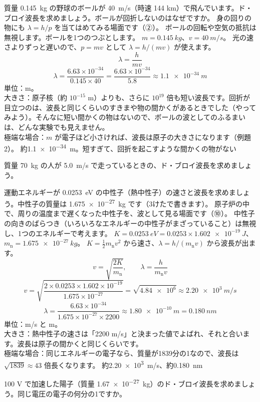 \label{ph:原-3:ex4}
\begin{phreidai}[野球のボールの波長]
質量 \qty{0.145}{kg} の野球のボールが \qty{40}{m/s}（時速 144 km）で飛んでいます。ド・ブロイ波長を求めましょう。ボールが回折しないのはなぜですか。
\phbamen
身の回りの物にも $\lambda=h/p$ を当てはめてみる場面です（②）。
\phmushi
ボールの回転や空気の抵抗は無視します。ボールを1つのつぶとします。
\phzu
$m=\qty{0.145}{kg}$、$v=\qty{40}{m/s}$。
\phriyu
光の速さよりずっと遅いので、$p=mv$ として $\lambda=h/(mv)$ が使えます。
\phtateru
\[ \lambda=\frac{h}{mv} \]
\phtoku
\[ \lambda=\frac{6.63\times10^{-34}}{0.145\times40}=\frac{6.63\times10^{-34}}{5.8}\approx\qty{1.1e-34}{m} \]
\phtashikame
単位：m。\\
大きさ：原子核（約 $10^{-15}$ m）よりも、さらに $10^{19}$ 倍も短い波長です。回折が目立つのは、波長と同じくらいのすきまや物の間かくがあるときでした（やってみよう）。そんなに短い間かくの物はないので、ボールの波としてのふるまいは、どんな実験でも見えません。\\
極端な場合：$m$ が電子ほど小さければ、波長は原子の大きさになります（例題2）。
\kotae 約\qty{1.1e-34}{m}。短すぎて、回折を起こすような間かくの物がない
\end{phreidai}
\begin{jibun}
質量 \qty{70}{kg} の人が \qty{5.0}{m/s} で走っているときの、ド・ブロイ波長を求めましょう。
\end{jibun}

\label{ph:原-3:ex5}
\begin{phreidai}[熱中性子の速さと波長]
運動エネルギーが \qty{0.0253}{eV} の中性子（熱中性子）の速さと波長を求めましょう。中性子の質量は \qty{1.675e-27}{kg} です（3けたで書きます）。
\phbamen
原子炉の中で、周りの温度まで遅くなった中性子を、波として見る場面です（⑩）。
\phmushi
中性子の向きのばらつき（いろいろなエネルギーの中性子がまざっていること）は無視し、1つのエネルギーで考えます。
\phzu
$K=\qty{0.0253}{eV}=0.0253\times\qty{1.602e-19}{J}$、$m_{\mathrm n}=\qty{1.675e-27}{kg}$。
\phriyu
$K=\tfrac12m_{\mathrm n}v^2$ から速さ、$\lambda=h/(m_{\mathrm n}v)$ から波長が出ます。
\phtateru
\[ v=\sqrt{\frac{2K}{m_{\mathrm n}}},\qquad\lambda=\frac{h}{m_{\mathrm n}v} \]
\phtoku
\[ v=\sqrt{\frac{2\times0.0253\times1.602\times10^{-19}}{1.675\times10^{-27}}}=\sqrt{\num{4.84e6}}\approx\qty{2.20e3}{m/s} \]
\[ \lambda=\frac{6.63\times10^{-34}}{1.675\times10^{-27}\times2200}\approx\qty{1.80e-10}{m}=\qty{0.180}{nm} \]
\phtashikame
単位：m/s と m。\\
大きさ：熱中性子の速さは「2200 m/s」と決まった値でよばれ、それと合います。波長は原子の間かくと同じくらいです。\\
極端な場合：同じエネルギーの電子なら、質量が1839分の1なので、波長は $\sqrt{1839}\approx43$ 倍長くなります。
\kotae 約\qty{2.20e3}{m/s}、約\qty{0.180}{nm}
\end{phreidai}
\begin{jibun}
100 V で加速した陽子（質量 \qty{1.67e-27}{kg}）のド・ブロイ波長を求めましょう。同じ電圧の電子の何分の1ですか。
\end{jibun}

